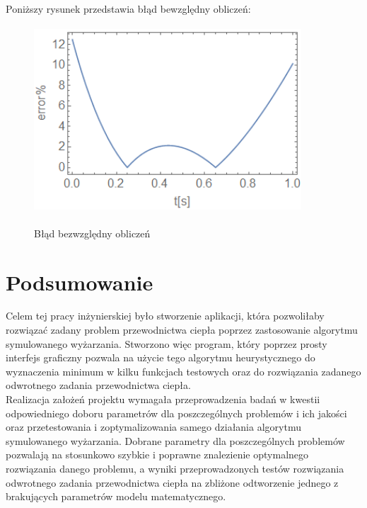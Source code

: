 \documentclass[twoside]{projektInzynierskiMS1}
\newcommand{\si}{ś}
\begin{document}
Poniższy rysunek przedstawia błąd bewzględny obliczeń: \\

\begin{figure}[H]
\begin{center}
		\includegraphics[height=7cm, width=10cm]{pics/5abs.png}\\
	\caption{Błąd bezwzględny obliczeń}
\end{center}
\end{figure}





\section{Podsumowanie}
Celem tej pracy inżynierskiej było stworzenie aplikacji, która pozwoliłaby rozwiązać zadany problem przewodnictwa ciepła poprzez zastosowanie algorytmu symulowanego wyżarzania. Stworzono więc program, który poprzez prosty interfejs graficzny pozwala na użycie tego algorytmu heurystycznego do wyznaczenia minimum w kilku funkcjach testowych oraz do rozwiązania zadanego odwrotnego zadania przewodnictwa ciepła. \\

Realizacja założeń projektu wymagała przeprowadzenia badań w kwestii odpowiedniego doboru parametrów dla poszczególnych problemów i ich jako\si ci oraz przetestowania i zoptymalizowania samego działania algorytmu symulowanego wyżarzania. Dobrane parametry dla poszczególnych problemów pozwalają na stosunkowo szybkie i poprawne znalezienie optymalnego rozwiązania danego problemu, a wyniki przeprowadzonych testów rozwiązania odwrotnego zadania przewodnictwa ciepła na zbliżone odtworzenie jednego z brakujących parametrów modelu matematycznego. \\
\end{document}
